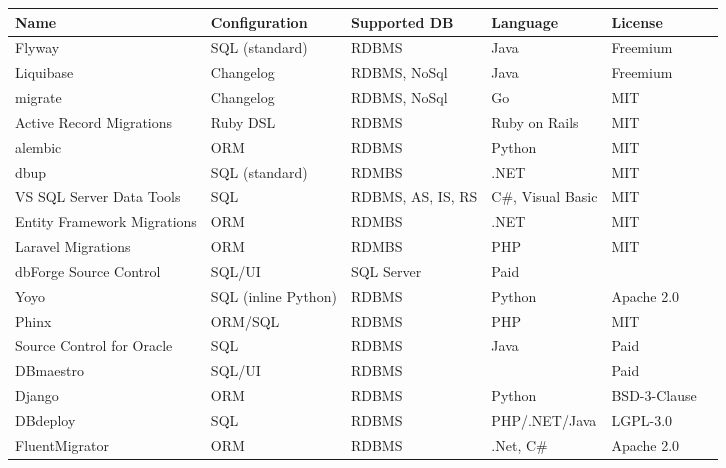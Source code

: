 \begin{table}[H]
	\centering
	\begin{tabularx}{15cm}{p{3cm} p{3cm} p{2cm} l l p{2cm} }
		\toprule
		Name & Configuration & Supported DB  & Language & License\\ 
		\midrule
		Flyway & SQL (standard) & RDBMS & Java & Freemium \\
		Liquibase & Changelog & RDBMS, NoSql & Java & Freemium \\
		migrate & Changelog & RDBMS, NoSql &  Go & MIT\\
		Active Record Migrations & Ruby DSL & RDBMS & Ruby on Rails & MIT\\
		alembic & ORM & RDBMS & Python &  MIT \\
		dbup & SQL (standard) & RDMBS& .NET & MIT\\
		VS SQL Server Data Tools & SQL & RDBMS, \gls{AS}, \gls{IS}, \gls{RS} & C\#, Visual Basic & MIT \\
		Entity Framework Migrations & ORM & RDMBS & .NET & MIT \\
		Laravel Migrations & ORM & RDMBS & PHP & MIT \\
		dbForge Source Control & SQL/UI & SQL Server & Paid\\
		Yoyo & SQL (inline Python) & RDBMS & Python & Apache 2.0\\
		Phinx & ORM/SQL & RDBMS &  PHP & MIT\\
		Source Control for Oracle & SQL & RDBMS & Java & Paid\\
		DBmaestro & SQL/UI & RDBMS & & Paid\\
		Django & ORM & RDBMS& Python& BSD-3-Clause\\
		DBdeploy & SQL & RDBMS & PHP/.NET/Java & LGPL-3.0\\
		FluentMigrator & ORM &RDBMS& .Net, C\# & Apache 2.0\\
	\end{tabularx}
\end{table}

